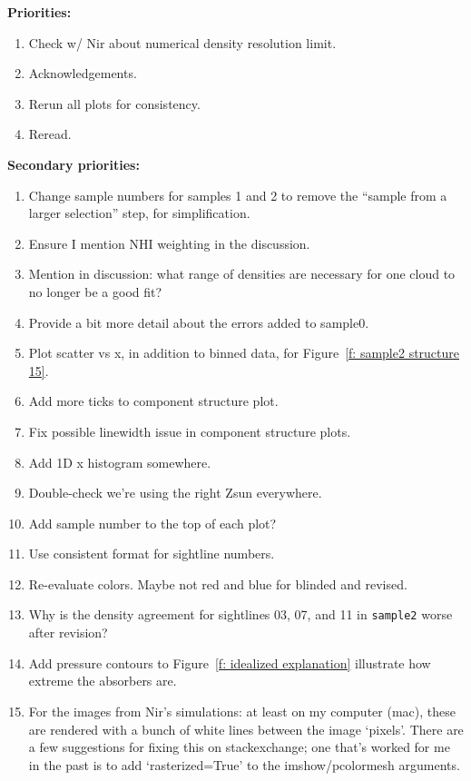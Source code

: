 \documentclass[fleqn,usenatbib]{mnras}
\begin{document}

\textbf{Priorities:}
\begin{enumerate}
    \item Check w/ Nir about numerical density resolution limit.
    \item Acknowledgements.
    \item Rerun all plots for consistency.
    \item Reread.
\end{enumerate}

\textbf{Secondary priorities:}
\begin{enumerate}
    \item Change sample numbers for samples 1 and 2 to remove the ``sample from a larger selection'' step, for simplification.
    \item Ensure I mention NHI weighting in the discussion.
    \item Mention in discussion: what range of densities are necessary for one cloud to no longer be a good fit?
    \item Provide a bit more detail about the errors added to sample0.
    \item Plot scatter vs x, in addition to binned data, for Figure~\ref{f: sample2 structure 15}.
    \item Add more ticks to component structure plot.
    \item Fix possible linewidth issue in component structure plots.
    \item Add 1D x histogram somewhere.
    \item Double-check we're using the right Zsun everywhere.
    \item Add sample number to the top of each plot?
    \item Use consistent format for sightline numbers.
    \item Re-evaluate colors. Maybe not red and blue for blinded and revised.
    \item Why is the density agreement for sightlines 03, 07, and 11 in \texttt{sample2} worse after revision?
    \item Add pressure contours to Figure~\ref{f: idealized explanation} illustrate how extreme the absorbers are.
    \item For the images from Nir's simulations: at least on my computer (mac), these are rendered with a bunch of white lines between the image `pixels'. There are a few suggestions for fixing this on stackexchange; one that's worked for me in the past is to add `rasterized=True' to the imshow/pcolormesh arguments. 
\end{enumerate}
\end{document}
